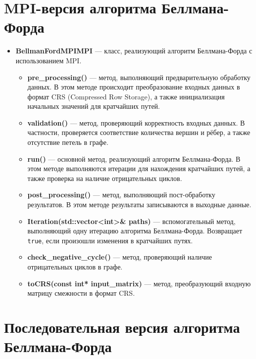 \documentclass[12pt]{article}
\begin{document}
\section*{MPI-версия алгоритма Беллмана-Форда}

\begin{itemize}
    \item \textbf{BellmanFordMPIMPI} — класс, реализующий алгоритм Беллмана-Форда с использованием MPI.
    \begin{itemize}
        \item \textbf{pre\_processing()} — метод, выполняющий предварительную обработку данных. В этом методе происходит преобразование входных данных в формат CRS (Compressed Row Storage), а также инициализация начальных значений для кратчайших путей.
        \item \textbf{validation()} — метод, проверяющий корректность входных данных. В частности, проверяется соответствие количества вершин и рёбер, а также отсутствие петель в графе.
        \item \textbf{run()} — основной метод, реализующий алгоритм Беллмана-Форда. В этом методе выполняются итерации для нахождения кратчайших путей, а также проверка на наличие отрицательных циклов.
        \item \textbf{post\_processing()} — метод, выполняющий пост-обработку результатов. В этом методе результаты записываются в выходные данные.
        \item \textbf{Iteration(std::vector<int>\& paths)} — вспомогательный метод, выполняющий одну итерацию алгоритма Беллмана-Форда. Возвращает \texttt{true}, если произошли изменения в кратчайших путях.
        \item \textbf{check\_negative\_cycle()} — метод, проверяющий наличие отрицательных циклов в графе.
        \item \textbf{toCRS(const int* input\_matrix)} — метод, преобразующий входную матрицу смежности в формат CRS.
    \end{itemize}
\end{itemize}

\section*{Последовательная версия алгоритма Беллмана-Форда}
\end{document}
